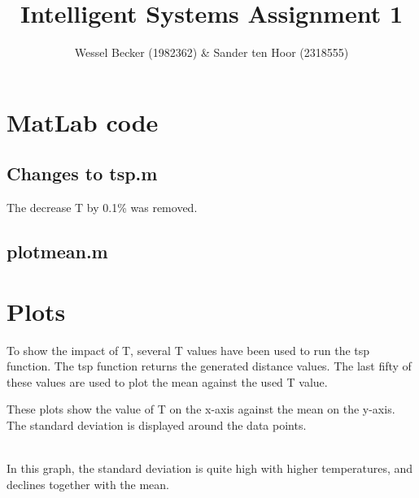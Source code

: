 \documentclass[10pt,a4paper]{article}
\begin{document}
\title{Intelligent Systems Assignment 1}
\author{Wessel Becker (1982362) \& Sander ten Hoor (2318555)}
\maketitle
\section{MatLab code}
\subsection{Changes to tsp.m}
The decrease T by 0.1\% was removed.


\subsection{plotmean.m}


\section{Plots}
To show the impact of T, several T values have been used to run the tsp function. The tsp function returns the generated distance values. The last fifty of these values are used to plot the mean against the used T value.

These plots show the value of T on the x-axis against the mean on the y-axis. The standard deviation is displayed around the data points.

 \\
In this graph, the standard deviation is quite high with higher temperatures, and declines together with the mean. 
\end{document}
